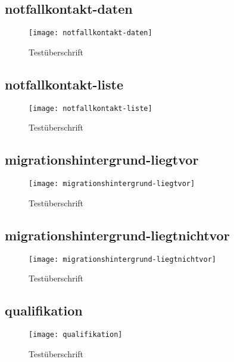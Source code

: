 \begin{landscape}
\subsection{notfallkontakt-daten}
\label{section-notfallkontakt-daten}
\begin{figure}[H]
    \centering
    \caption{Testüberschrift}
    \begin{adjustbox}{width=0.6\linewidth, center}
        \texttt{[image: notfallkontakt-daten]}
    \end{adjustbox}
\end{figure}

\subsection{notfallkontakt-liste}
\label{section-notfallkontakt-liste}
\begin{figure}[H]
    \centering
    \caption{Testüberschrift}
    \begin{adjustbox}{width=\linewidth, center}
        \texttt{[image: notfallkontakt-liste]}
    \end{adjustbox}
\end{figure}

\subsection{migrationshintergrund-liegtvor}
\label{section-migrationshintergrund-liegtvor}
\begin{figure}[H]
    \centering
    \caption{Testüberschrift}
    \begin{adjustbox}{width=\linewidth, center}
        \texttt{[image: migrationshintergrund-liegtvor]}
    \end{adjustbox}
\end{figure}

\subsection{migrationshintergrund-liegtnichtvor}
\label{section-migrationshintergrund-liegtnichtvor}
\begin{figure}[H]
    \centering
    \caption{Testüberschrift}
    \begin{adjustbox}{width=\linewidth, center}
        \texttt{[image: migrationshintergrund-liegtnichtvor]}
    \end{adjustbox}
\end{figure}

\subsection{qualifikation}
\label{section-qualifikation}
\begin{figure}[H]
    \centering
    \caption{Testüberschrift}
    \begin{adjustbox}{width=\linewidth, center}
        \texttt{[image: qualifikation]}
    \end{adjustbox}
\end{figure}


\end{landscape}
